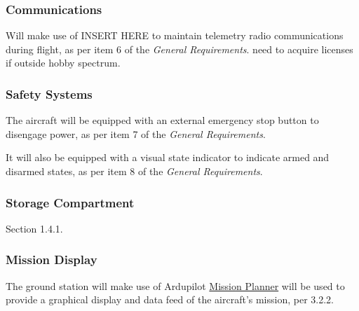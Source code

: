 \subsubsection*{Communications}
Will make use of INSERT HERE to maintain telemetry radio communications during flight, as per item 6 of the \textit{General Requirements}. need to acquire licenses if outside hobby spectrum.

\subsubsection*{Safety Systems}
The aircraft will be equipped with an external emergency stop button to disengage power, as per item 7 of the \textit{General Requirements}.

It will also be equipped with a visual state indicator to indicate armed and disarmed states, as per item 8 of the \textit{General Requirements}.

\subsubsection*{Storage Compartment}
Section 1.4.1.

\subsubsection*{Mission Display}
The ground station will make use of Ardupilot \href{http://planner.ardupilot.com/}{Mission Planner} will be used to provide a graphical display and data feed of the aircraft's mission, per 3.2.2.